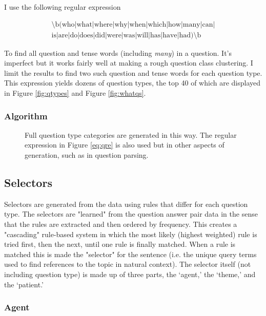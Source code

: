 \documentclass[twoside]{article}
\begin{document}
I use the following regular expression

\begin{equation} \label{eq:qre}
\begin{split}
\text{\textbackslash b(who|what|where|why|when|which|how|many|can|}\\
\text{is|are|do|does|did|were|was|will|has|have|had)\textbackslash b}
\end{split}
\end{equation}

To find all question and tense words (including \textit{many}) in a question.  It's imperfect but it works fairly well at making a rough question class clustering.  I limit the results to find two such question and tense words for each question type.  This expression yields dozens of question types, the top 40 of which are displayed in Figure \ref{fig:qtypes} and Figure \ref{fig:whatqs}.

\subsubsection{Algorithm}

\begin{figure}
\caption{Full question type categories are generated in this way.  The regular expression in Figure \ref{eq:qre} is also used but in other aspects of generation, such as in question parsing. \label{fig:alg1}}

\end{figure}

\subsection{Selectors}

Selectors are generated from the data using rules that differ for each question type.  The selectors are "learned" from the question answer pair data in the sense that the rules are extracted and then ordered by frequency.  This creates a "cascading" rule-based system in which the most likely (highest weighted) rule is tried first, then the next, until one rule is finally matched.  When a rule is matched this is made the "selector" for the sentence (i.e. the unique query terms used to find references to the topic in natural context).  The selector itself (not including question type) is made up of three parts, the `agent,' the `theme,' and the `patient.'

\subsubsection{Agent}
\end{document}
